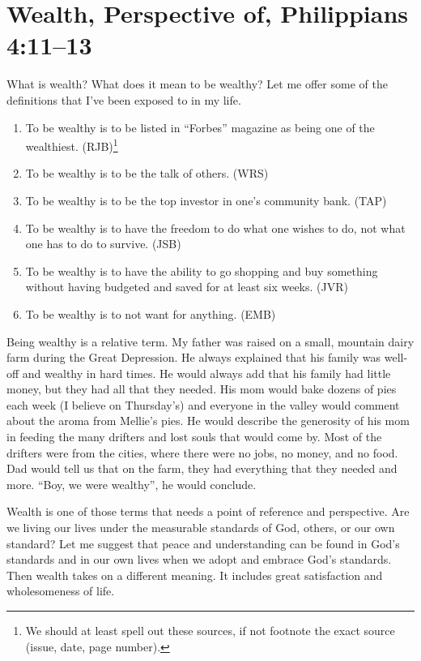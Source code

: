 \documentclass[12pt]{memoir}
\begin{document}
\section[Wealth, Perspective of]{Wealth, Perspective of, Philippians 4:11--13}

What is wealth? What does it mean to be wealthy? Let me offer some
of the definitions that I've been exposed to in my life.

\begin{enumerate}
\item To be wealthy is to be listed in ``Forbes'' magazine as being one
of the wealthiest. (RJB)\footnote{We should  at least spell out these sources, if not footnote the exact source (issue, date, page number).}
\item To be wealthy is to be the talk of others. (WRS)
\item To be wealthy is to be the top investor in one's community bank. (TAP)
\item To be wealthy is to have the freedom to do what one wishes to do, not what one has to do to survive. (JSB)
\item To be wealthy is to have the ability to go shopping and buy something without having budgeted and saved for at least six weeks. (JVR)
\item To be wealthy is to not want for anything. (EMB)
\end{enumerate}

Being wealthy is a relative term. My father was raised on a small,
mountain dairy farm during the Great Depression. He always explained
that his family was well-off and wealthy in hard times. He would always
add that his family had little money, but they had all that they needed.
His mom would bake dozens of pies each week (I believe on Thursday's)
and everyone in the valley would comment about the aroma from Mellie's
pies. He would describe the generosity of his mom in feeding the
many drifters and lost souls that would come by. Most of the drifters
were from the cities, where there were no jobs, no money, and no food.
Dad would tell us that on the farm, they had everything that they
needed and more. ``Boy, we were wealthy'', he would conclude. 

Wealth is one of those terms that needs a point of reference and perspective.
Are we living our lives under the measurable standards of God, others,
or our own standard? Let me suggest that peace and understanding
can be found in God's standards and in our own lives when we adopt
and embrace God's standards. Then wealth takes on a different meaning.
It includes great satisfaction and wholesomeness of life.
\end{document}
